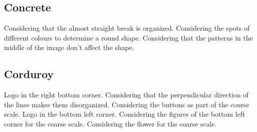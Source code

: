 \documentclass[12pt,a4paper]{article}
\begin{document}
\begin{singlespace}
\clearpage
\renewcommand{\mat}{Concrete}
\subsection{\mat}

\renewcommand{\Number}{01}\InputImage{\sfl}{\tco}{\sfl}{\tco}{\sfl}{\tco}
{}{}
\renewcommand{\Number}{02}\InputImage{\sfl}{\tco}{\sfl}{\tco}{\sexdi}{\tco}
{}{}
\renewcommand{\Number}{03}\InputImage{\sfl}{\tco}{\sfl}{\tco}{\sexdi}{\tbu}
{}{}
\renewcommand{\Number}{04}\InputImage{\sfl}{\tsc}{\sfl}{\tsc}{\sfl}{\tsc}
{}{}
\renewcommand{\Number}{05}\InputImage{\sfl}{\tco}{\sfl}{\tco}{\sexor}{\tco}
{}{}
\renewcommand{\Number}{06}\InputImage{\sfl}{\tco}{\sfl}{\tco}{\sexor}{\tco}
{}{Considering that the almost straight break is organized.}
\renewcommand{\Number}{07}\InputImage{\sfl}{\tco}{\sfl}{\tco}{\sro}{\tsc}
{}{Considering the spots of different colours to determine a round shape.}
\renewcommand{\Number}{08}\InputImage{\sfl}{\tco}{\sfl}{\tco}{\sfl}{\tco}
{}{Considering that the patterns in the middle of the image don't affect the shape.}
\renewcommand{\Number}{09}\InputImage{\sfl}{\tco}{\sfl}{\tco}{\sfl}{\tco}
{}{}
\renewcommand{\Number}{10}\InputImage{\sfl}{\tco}{\sfl}{\tco}{\sexdi}{\tco}
{}{}
\renewcommand{\Number}{11}\InputImage{\sfl}{\tco}{\sfl}{\tsc}{\sfl}{\tsc}
{}{}
\renewcommand{\Number}{12}\InputImage{\sfl}{\tsc}{\sfl}{\tsc}{\sfl}{\tsc}
{}{}

\clearpage
\renewcommand{\mat}{Corduroy}
\subsection{\mat}

\renewcommand{\Number}{01}\InputImage{\sexor}{\tsm}{\sexor}{\tsm}{\sexor}{\tbu}
{Logo in the right bottom corner.}{}
\renewcommand{\Number}{02}\InputImage{\sfl}{\tve}{\sexor}{\tbu}{\sexdi}{\tbu}
{}{Considering that the perpendicular direction of the lines makes them disorganized.}
\renewcommand{\Number}{03}\InputImage{\sfl}{\tsm}{\sexor}{\tbu}{\sexdi}{\tbu}
{}{}
\renewcommand{\Number}{04}\InputImage{\sfl}{\tsm}{\sexor}{\tbu}{\sexdi}{\tbu}
{}{}
\renewcommand{\Number}{05}\InputImage{\sfl}{\tve}{\sexor}{\tbu}{\sexdi}{\tbu}
{}{}
\renewcommand{\Number}{06}\InputImage{\sfl}{\tve}{\sexor}{\tbu}{\sro}{\tbu}
{}{Considering the buttons as part of the course scale.}
\renewcommand{\Number}{07}\InputImage{\sfl}{\tve}{\sexor}{\tbu}{\sexor}{\tbu}
{}{}
\renewcommand{\Number}{08}\InputImage{\sfl}{\tve}{\sexor}{\tbu}{\sexor}{\tbu}
{Logo in the bottom left corner.}{}
\renewcommand{\Number}{09}\InputImage{\sfl}{\tve}{\sexor}{\tbu}{\sexor}{\tbu}
{}{}
\renewcommand{\Number}{10}\InputImage{\sexor}{\tbu}{\sexor}{\tbu}{\sro}{\tbu}
{}{Considering the figures of the bottom left corner for the coarse scale.}
\renewcommand{\Number}{11}\InputImage{\sfl}{\tve}{\sexor}{\tbu}{\sexor}{\tbu}
{}{}
\renewcommand{\Number}{12}\InputImage{\sexor}{\tbu}{\sexor}{\tbu}{\sro}{\tbu}
{}{Considering the flower for the coarse scale.}


\end{singlespace}
\end{document}
